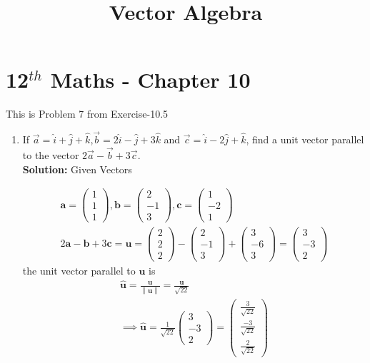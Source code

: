 \documentclass[10pt]{article}
\newcommand{\solution}{\noindent \textbf{Solution: }}
\newcommand{\myvec}[1]{\ensuremath{\begin{pmatrix}#1\end{pmatrix}}}
\providecommand{\norm}[1]{\left\lVert#1\right\rVert}
\let\vec\mathbf{}
\begin{document}
\begin{center}
\title{\textbf{Vector Algebra}}
\date{\vspace{-5ex}} %
\maketitle
\end{center}

\section{12$^{th}$ Maths - Chapter 10}
This is Problem 7 from Exercise-10.5
\begin{enumerate}
\item If $\overrightarrow{a}=\hat{i}+\hat{j}+\hat{k}$,$\overrightarrow{b}=2\hat{i}-\hat{j}+3\hat{k}$ and $\overrightarrow{c}=\hat{i}-2\hat{j}+\hat{k}$, find a unit vector parallel to the vector $2\overrightarrow{a}-\overrightarrow{b}+3\overrightarrow{c}$.\\  

\solution
Given Vectors

\begin{align}
\vec{a} =\myvec{1\\1\\1} , \vec{b}=\myvec{2\\-1\\3} , \vec{c}=\myvec{1\\-2\\1}\\
2\vec{a}-\vec{b}+3\vec{c}=\vec{u}=\myvec{2\\2\\2}-\myvec{2\\-1\\3}+\myvec{3\\-6\\3}=\myvec{3\\-3\\2}
\end{align}
the unit vector parallel to $\vec{u}$ is
\begin{align}
\hat{\vec{u}}=\frac{\vec{u}}{\norm{\vec{u}}}=\frac{\vec{u}}{\sqrt{22}}\\
\implies\hat{\vec{u}}=\frac{1}{\sqrt{22}}\myvec{3\\-3\\2}=\myvec{\frac{3}{\sqrt{22}}\\[4pt] \frac{-3}{\sqrt{22}}\\[4pt] \frac{2}{\sqrt{22}}}
\end{align}

\end{enumerate}
\end{document}
